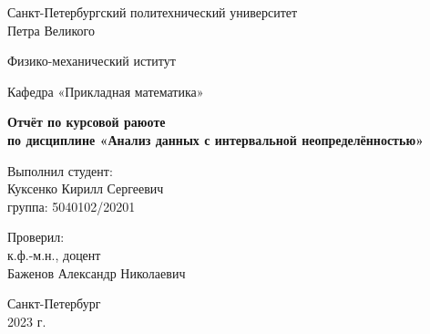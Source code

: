 \begin{titlepage}
	\begin{center}
		{\large Санкт-Петербургский политехнический университет\\Петра Великого\\}
	\end{center}
	
	\begin{center}
		{\large Физико-механический иститут}
	\end{center}
	
	
	\begin{center}
		{\large Кафедра «Прикладная математика»}
	\end{center}
	
	\vspace{8em}
	
	\begin{center}
		{\bfseries Отчёт по курсовой раюоте \\по дисциплине «Анализ данных с интервальной неопределённостью»}
	\end{center}
	
	\vspace{5em}
	
	\begin{flushleft}
		\hspace{16em}Выполнил студент:\\\hspace{16em}Куксенко Кирилл Сергеевич\\\hspace{16em}группа: 5040102/20201
		
		\vspace{2em}
		
		\hspace{16em}Проверил:\\\hspace{16em}к.ф.-м.н., доцент\\\hspace{16em}Баженов Александр Николаевич
		
	\end{flushleft}
	
	
	\vspace{6em}
	
	
	\begin{center}
		Санкт-Петербург\\2023 г.
	\end{center}	
	
\end{titlepage}